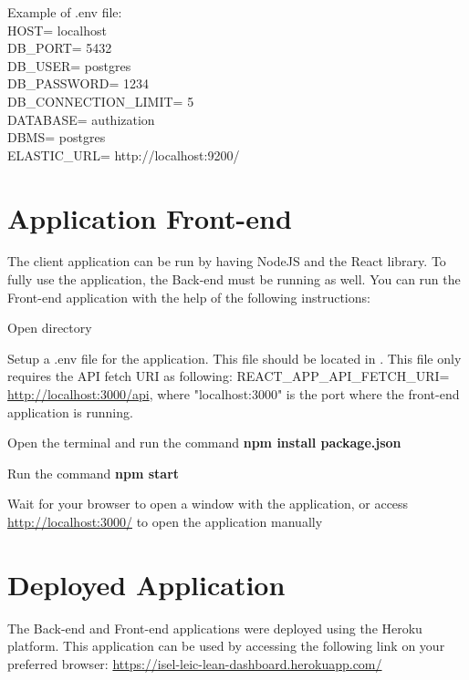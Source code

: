 \documentclass{article}
\begin{document}
\newpage
Example of .env file:\\
\newline
HOST= localhost \\
DB\_PORT= 5432 \\
DB\_USER= postgres \\
DB\_PASSWORD= 1234 \\
DB\_CONNECTION\_LIMIT= 5 \\
DATABASE= authization \\
DBMS= postgres \\
ELASTIC\_URL= http://localhost:9200/ \\

\section{Application Front-end}
The client application can be run by having NodeJS and the React library. To fully use the application, the Back-end must be running as well.
You can run the Front-end application with the help of the following instructions:

\begin{center}
\begin{steps}
  \item Open directory 
  \item Setup a .env file for the application. This file should be located in . This file only requires the API fetch URI as following: REACT\_APP\_API\_FETCH\_URI= \url{http://localhost:3000/api}, where "localhost:3000" is the port where the front-end application is running.
  \item Open the terminal and run the command \textbf{npm install package.json}
  \item Run the command \textbf{npm start}
  \item Wait for your browser to open a window with the application, or access \url{http://localhost:3000/} to open the application manually
 
\end{steps}
\end{center}

\section{Deployed Application}
The Back-end and Front-end applications were deployed using the Heroku platform. This application can be used by accessing the following link on your preferred browser: \url{https://isel-leic-lean-dashboard.herokuapp.com/}
\end{document}
